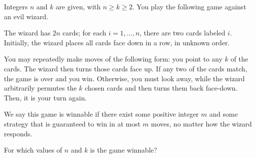 Integers $n$ and $k$ are given, with $n\ge k\ge2$. You play the following game against an evil wizard.

The wizard has $2n$ cards; for each $i=1,\ldots,n$,  there are two cards labeled $i$. Initially, the wizard places all cards face down in a row, in unknown order.

You may repeatedly make moves of the following form: you point to any $k$ of the cards. The wizard then turns those cards face up. If any two of the cards match, the game is over and you win. Otherwise, you must look away, while the wizard arbitrarily permutes the $k$ chosen cards and then turns them back face-down. Then, it is your turn again.

We say this game is winnable if there exist some positive integer $m$ and some strategy that is guaranteed to win in at most $m$ moves, no matter how the wizard responds.

For which values of $n$ and $k$ is the game winnable?
